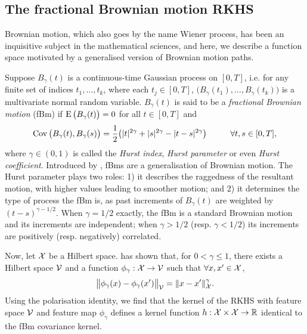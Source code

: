 \subsection{The fractional Brownian motion RKHS}

Brownian motion, which also goes by the name Wiener process, has been an inquisitive subject in the mathematical sciences, and here, we describe a function space motivated by a generalised version of Brownian motion paths.

Suppose $B_\gamma(t)$ is a continuous-time Gaussian process on $[0,T]$, i.e. for any finite set of indices $t_1,\dots,t_k$, where each $t_j \in [0,T]$, $\big(B_\gamma(t_1),\dots,B_\gamma(t_k)\big)$ is a multivariate normal random variable.
$B_\gamma(t)$ is said to be a \emph{fractional Brownian motion} (fBm) if $\operatorname{E} \big( B_\gamma(t)\big) = 0$ for all $t \in [0,T]$ and 
\vspace{-0.5em}
\[
  \operatorname{Cov}\big( B_\gamma(t),B_\gamma(s) \big) = \frac{1}{2}\big( |t|^{2\gamma} + |s|^{2\gamma} - |t-s|^{2\gamma} \big) \hspace{1cm} \forall t,s \in [0,T],
\]
where $\gamma \in (0,1)$ is called the \emph{Hurst index}, \emph{Hurst parameter} or even \emph{Hurst coefficient}.
Introduced by \citet{mandelbrot1968fractional}, fBms are a generalisation of Brownian motion.
The Hurst parameter plays two roles: 1) it describes the raggedness of the resultant motion, with higher values leading to smoother motion; and 2) it determines the type of process the fBm is, as past increments of $B_\gamma(t)$ are weighted by $(t-s)^{\gamma-1/2}$.
When $\gamma=1/2$ exactly, the fBm is a standard Brownian motion and its increments are independent; when $\gamma > 1/2$ (resp. $\gamma < 1/2$) its increments are positively (resp. negatively) correlated.

Now, let ${\mathcal X}$ be a Hilbert space. 
\citet[Theorem 3]{schoenberg1937} has shown that, for $0 < \gamma\leq 1$, there exists a Hilbert space ${\mathcal V}$ and a function $\phi_\gamma:{\mathcal X}\to{\mathcal V}$ such that $\forall x,x' \in {\mathcal X}$,
\[
  \big\Vert \phi_\gamma(x) - \phi_\gamma(x') \big\Vert_{\mathcal V} = \lVert x-x'\rVert_{\mathcal X}^\gamma.
\]
Using the polarisation identity, 
we find that the kernel of the RKHS with feature space ${\mathcal V}$ and feature map $\phi_\gamma$ defines a kernel function $h:{\mathcal X}\times{\mathcal X}\to\mathbb{R}$ identical to the fBm covariance kernel.

